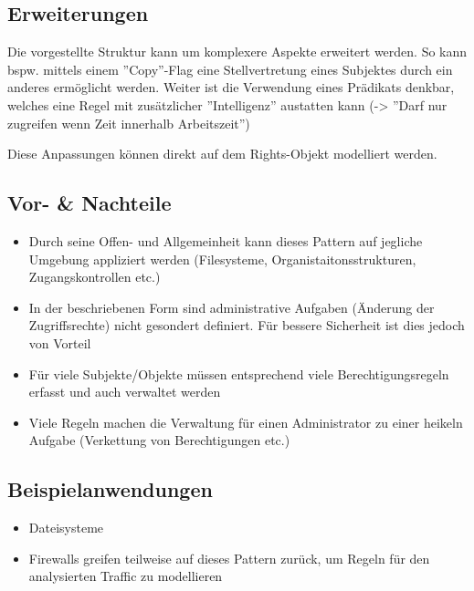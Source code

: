 \subsection*{Erweiterungen}
Die vorgestellte Struktur kann um komplexere Aspekte erweitert werden. So kann bspw. mittels einem ''Copy''-Flag eine Stellvertretung eines Subjektes durch ein anderes ermöglicht werden.
Weiter ist die Verwendung eines Prädikats denkbar, welches eine Regel mit zusätzlicher ''Intelligenz'' austatten kann (-> ''Darf nur zugreifen wenn Zeit innerhalb Arbeitszeit'')

Diese Anpassungen können direkt auf dem Rights-Objekt modelliert werden.

\subsection*{Vor- \& Nachteile}
\begin{itemize}
	\item Durch seine Offen- und Allgemeinheit kann dieses Pattern auf jegliche Umgebung appliziert werden (Filesysteme, Organistaitonsstrukturen, Zugangskontrollen etc.)
	\item In der beschriebenen Form sind administrative Aufgaben (Änderung der Zugriffsrechte) nicht gesondert definiert. Für bessere Sicherheit ist dies jedoch von Vorteil
	\item Für viele Subjekte/Objekte müssen entsprechend viele Berechtigungsregeln erfasst und auch verwaltet werden
	\item Viele Regeln machen die Verwaltung für einen Administrator zu einer heikeln Aufgabe (Verkettung von Berechtigungen etc.)
\end{itemize}

\subsection*{Beispielanwendungen}
\begin{itemize}
	\item Dateisysteme
	\item Firewalls greifen teilweise auf dieses Pattern zurück, um Regeln für den analysierten Traffic zu modellieren
\end{itemize}